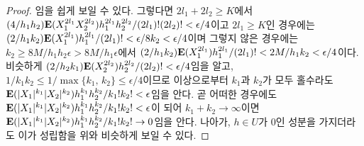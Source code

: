 \begin{proof}
    임을 쉽게 보일 수 있다. 그렇다면 $2l_1+2l_2\geq K$에서 $(4/h_1h_2)\mathbf{E}(X_1^{2l_1}X_2^{2l_2})h_1^{2l_1}h_2^{2l_2}/(2l_1)!(2l_2)!<\epsilon/4$이고 $2l_1\geq K$인 경우에는 $(2/h_1k_2)\mathbf{E}(X_1^{2l_1})h_1^{2l_1}/(2l_1)!<\epsilon/8k_2<\epsilon/4$이며 그렇지 않은 경우에는 $k_2\geq 8M/h_1h_2\epsilon>8M/h_1\epsilon$에서 $(2/h_1k_2)\mathbf{E}(X_1^{2l_1})h_1^{2l_1}/(2l_1)!<2M/h_1k_2<\epsilon/4$이다. 비슷하게 $(2/h_2k_1)\mathbf{E}(X_2^{2l_2})h_2^{2l_2}/(2l_2)!<\epsilon/4$임을 알고, $1/k_1k_2\leq1/\max\{k_1,\,k_2\}\leq\epsilon/4$이므로 이상으로부터 $k_1$과 $k_2$가 모두 홀수라도 $\mathbf{E}(|X_1|^{k_1}|X_2|^{k_2})h_1^{k_1}h_2^{k_2}/k_1!k_2!<\epsilon$임을 안다. 곧 어떠한 경우에도 $\mathbf{E}(|X_1|^{k_1}|X_2|^{k_2})h_1^{k_1}h_2^{k_2}/k_1!k_2!<\epsilon$이 되어 $k_1+k_2\to\infty$이면 $\mathbf{E}(|X_1|^{k_1}|X_2|^{k_2})h_1^{k_1}h_2^{k_2}/k_1!k_2!\to0$임을 안다. 나아가, $h\in U$가 $0$인 성분을 가지더라도 이가 성립함을 위와 비슷하게 보일 수 있다.
    

\end{proof}
